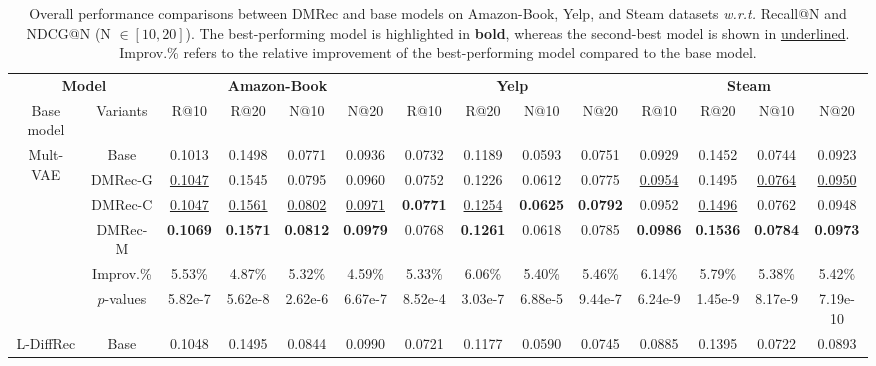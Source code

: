 \documentclass[sigconf]{acmart}
\begin{document}
\begin{table}
\small
        \centering
\setlength{\abovecaptionskip}{0.1cm}
\setlength{\belowcaptionskip}{0.1cm} 
  \caption{Overall performance comparisons between \textsf{DMRec} and base models on Amazon-Book, Yelp, and Steam datasets \textit{w.r.t.} Recall@N and NDCG@N (N $\in [10, 20]$). The best-performing model is highlighted in \textbf{bold}, whereas the second-best model is shown in \underline{underlined}. Improv.\% refers to the relative improvement of the best-performing model compared to the base model.}
  \label{performance1}
  \begin{tabular}{c|c|cccc|cccc|cccc}
    \hline
    \multicolumn{2}{c|}{\textbf{Model}}&\multicolumn{4}{c|}{\textbf{Amazon-Book}}&
    \multicolumn{4}{c|}{\textbf{Yelp}}&
    \multicolumn{4}{c}{\textbf{Steam}}\\
	\cline{1-14}		Base model&Variants&R@10&R@20&N@10&N@20&R@10&R@20&N@10&N@20&R@10&R@20&N@10&N@20\\
    \hline
    \hline
    \multirow{6}{*}{Mult-VAE} &Base \cite{liang2018variational} & 0.1013 & 0.1498 & 0.0771 & 0.0936 & 0.0732 & 0.1189 & 0.0593 & 0.0751 & 0.0929 &0.1452 & 0.0744 & 0.0923\\
    \cline{2-14}
    ~ &\textsf{DMRec-G} & \underline{0.1047} & 0.1545 & 0.0795 & 0.0960 & 0.0752 & 0.1226 & 0.0612 &0.0775 & \underline{0.0954} & 0.1495 & \underline{0.0764} & \underline{0.0950}\\
    ~ & \textsf{DMRec-C} & \underline{0.1047} & \underline{0.1561} & \underline{0.0802} & \underline{0.0971} & \textbf{0.0771} &\underline{0.1254} & \textbf{0.0625} & \textbf{0.0792} &0.0952 & \underline{0.1496} & 0.0762 & 0.0948\\
    ~ & \textsf{DMRec-M} & \textbf{0.1069} & \textbf{0.1571} & \textbf{0.0812} & \textbf{0.0979} & 0.0768 & \textbf{0.1261} & 0.0618 & 0.0785 & \textbf{0.0986} & \textbf{0.1536} & \textbf{0.0784} & \textbf{0.0973}\\
    \cline{2-14}
     ~ & Improv.\% & 5.53\% & 4.87\% & 5.32\% & 4.59\% & 5.33\% & 6.06\% & 5.40\% & 5.46\% & 6.14\% & 5.79\% & 5.38\% & 5.42\%\\
~ & $p$-values & 5.82e-7 & 5.62e-8 & 2.62e-6 & 6.67e-7 & 8.52e-4 & 3.03e-7 & 6.88e-5 & 9.44e-7 & 6.24e-9 & 1.45e-9 & 8.17e-9 & 7.19e-10\\
      \hline
        \multirow{6}{*}{L-DiffRec} &Base \cite{wang2023diffusion} & 0.1048 & 0.1495 & 0.0844 & 0.0990 & 0.0721 & 0.1177 & 0.0590 & 0.0745 &0.0885 & 0.1395 & 0.0722 & 0.0893\\

\end{tabular}
\end{table}
\end{document}

